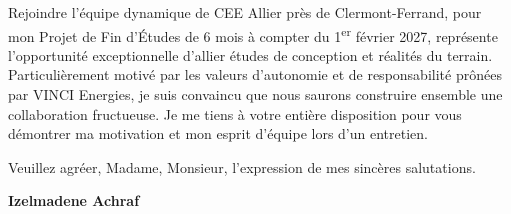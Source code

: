 \documentclass[10pt,a4paper]{altacv}
\begin{document}
\vspace{0.6cm}

Rejoindre l'équipe dynamique de CEE Allier près de Clermont-Ferrand, pour mon Projet de Fin d'Études de 6 mois à compter du 1\textsuperscript{er} février 2027, représente l'opportunité exceptionnelle d'allier études de conception et réalités du terrain. Particulièrement motivé par les valeurs d'autonomie et de responsabilité prônées par VINCI Energies, je suis convaincu que nous saurons construire ensemble une collaboration fructueuse. Je me tiens à votre entière disposition pour vous démontrer ma motivation et mon esprit d'équipe lors d'un entretien.

\vspace{0.8cm}

Veuillez agréer, Madame, Monsieur, l'expression de mes sincères salutations.

\vfill

\begin{flushright}
  \Large\color{emphasis}\textbf{Izelmadene Achraf}
\end{flushright}
\end{document}
